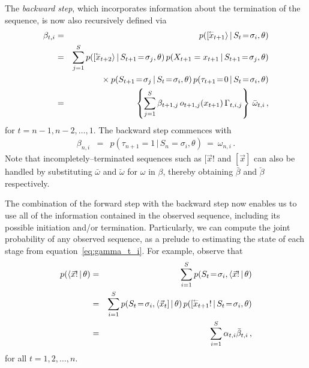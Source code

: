 \documentclass[a4paper]{article}
\newcommand{\rvec}[1]{\accentset{\leftarrow}{#1}}
\begin{document}
The {\em backward step}, which incorporates information about the termination of the sequence, is now also recursively defined via
\begin{eqnarray}
   \beta_{t,i} & = & p([\rvec{x}_{t+1}\rangle\,|\,S_t\!=\!\sigma_i,\theta)
\nonumber\\& = & 
   \sum_{j=1}^{S}p([\rvec{x}_{t+2}\rangle\,|\,S_{t+1}\!=\!\sigma_j,\theta)\,p(X_{t+1}=x_{t+1}\,|\,S_{t+1}\!=\!\sigma_j,\theta)
\nonumber\\&& \hspace*{5mm}{}\times
       p(S_{t+1}\!=\!\sigma_j\,|\,S_t\!=\!\sigma_i,\theta)\,p(\tau_{t+1}\!=\!0\,|\,S_t\!=\!\sigma_i,\theta)
\nonumber\\& = & 
	\left\{\sum_{j=1}^{S}\beta_{t+1,j}\,o_{t+1,j}(x_{t+1})\,\Gamma_{t,i,j}\right\}\,\bar{\omega}_{t,i}
\,,
\end{eqnarray}
for $t=n-1,n-2,\ldots,1$. The backward step commences with
\begin{eqnarray}
   \beta_{n,i} & = & p(\tau_{n+1}\!=\!1\,|\,S_n\!=\!\sigma_i,\theta)~=~\omega_{n,i}\,.
\end{eqnarray}
Note that incompletely--terminated sequences such as $[\vec{x}!$ and $[\vec{x}]$ can also be handled by substituting $\bar{\omega}$ and $\breve{\omega}$ for $\omega$ in $\beta$, thereby obtaining
$\bar{\beta}$ and $\breve{\beta}$ respectively.

The combination of the forward step with the backward step now enables us to use all of the information contained in the observed sequence, including its possible initiation and/or termination.
Particularly, we can compute the joint probability of any observed sequence, as a prelude to estimating the state of each stage
from equation~\eqref{eq:gamma_t_i}. For example, observe that
\begin{eqnarray}
   p(\langle\vec{x}!\,|\,\theta) 
& = &
	\sum_{i=1}^{S}p(S_t\!=\!\sigma_i,\langle\vec{x}!\,|\,\theta)
\nonumber\\& = &
   \sum_{i=1}^{S}p(S_t\!=\!\sigma_i,\langle\vec{x}_t]\,|\,\theta)\,p([\rvec{x}_{t+1}!\,|\,S_t\!=\!\sigma_i,\theta) 
\nonumber\\& = &
   \sum_{i=1}^{S}\alpha_{t,i}\bar{\beta}_{t,i}\,,
\end{eqnarray}
for all $t=1,2,\ldots,n$.
\end{document}

